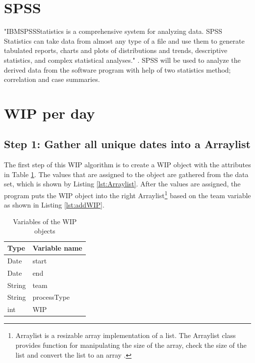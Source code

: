 \documentclass[UKenglish]{ifimaster}  %
\begin{document}
\section{SPSS}
\label{sec:SPSS}
"IBM\circledR  SPSS\circledR Statistics is a comprehensive system for analyzing data. SPSS Statistics can take data from almost any type of a file and use them to generate tabulated reports, charts and plots of distributions and trends, descriptive statistics, and complex statistical analyses." \parencite{IBM}. SPSS will be used to analyze the derived data from the software program with help of two statistics method; correlation and case summaries. 


\section {WIP per day}
\label{WPD}


\subsection{Step 1: Gather all unique dates into a Arraylist}
\label{sub:stepOne}
The first step of this WIP algorithm is to create a WIP object with the attributes in Table \ref{tab:object}.  The values that are assigned to the object are gathered from the data set, which is shown by Listing \ref{lst:Arraylist}. After the values are assigned, the program puts the WIP object into the right Arraylist\footnote{Arraylist is a resizable array implementation of a list. The Arraylist class provides function for manipulating the size of the array, check the size of the list and convert the list to an array  \parencite{Arraylist}.} based on the team variable as shown in Listing \ref{lst:addWIP}. 
\begin{table}[!ht]
\begin{center}
\caption{Variables of the WIP objects}
\begin{tabular}{| l | l |}
\hline
\bf{Type} & \bf{Variable name} \\ \hline
Date & start \\ \hline
Date & end\\ \hline
String & team\\ \hline
String & processType\\ \hline
int  & WIP\\ \hline
\end{tabular}
\label{tab:object}
\end{center}
\end{table}
\end{document}
